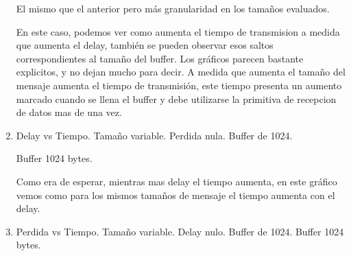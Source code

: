 \begin{enumerate}
  El mismo que el anterior pero m\'as granularidad en los tama\~nos evaluados.

  En este caso, podemos ver como aumenta el tiempo de transmision a medida que aumenta el delay, tambi\'en se pueden observar  esos saltos correspondientes al tama\~no del buffer. Los gr\'aficos parecen bastante explicitos, y no dejan mucho para decir. A medida que aumenta el tama\~no del mensaje aumenta el tiempo de transmisi\'on, este tiempo presenta un aumento marcado cuando se llena el buffer y debe utilizarse la primitiva de recepcion de datos mas de una vez.


\item Delay vs Tiempo. Tama\~no variable. Perdida nula. Buffer de 1024.

  Buffer 1024 bytes. 

  Como era de esperar, mientras mas delay el tiempo aumenta, en este gr\'afico vemos como para los mismos tama\~nos de mensaje el tiempo aumenta con el delay. 

\item Perdida vs Tiempo. Tama\~no variable. Delay nulo. Buffer de 1024.
  Buffer 1024 bytes.

\end{enumerate}